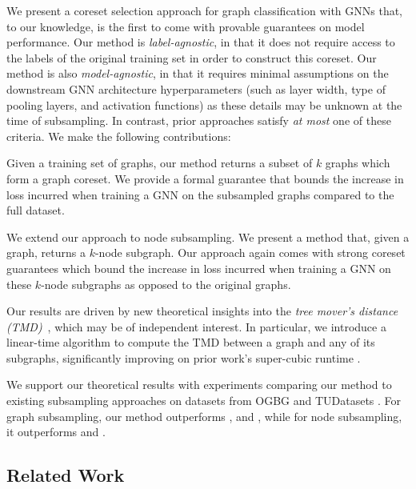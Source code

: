 We present a coreset selection approach for graph classification with GNNs that, to our knowledge, is the first to come with provable guarantees on model performance. Our method is \emph{label-agnostic}, in that it does not require access to the labels of the original training set in order to construct this coreset. Our method is also \emph{model-agnostic}, in that it requires minimal assumptions on the downstream GNN architecture hyperparameters (such as layer width, type of pooling layers, and activation functions) as these details may be unknown at the time of subsampling. In contrast, prior approaches satisfy \emph{at most} one of these criteria. We make the following contributions:

\begin{description}[leftmargin=1.5em, labelindent=1.5em]
\item[Graph subsampling.] Given a training set of graphs, our method returns a subset of $k$ graphs which form a graph coreset. We provide a formal guarantee that bounds the increase in loss incurred when training a GNN on the subsampled graphs compared to the full dataset. 

\item[Node subsampling.] We extend our approach to node subsampling. We present a method that, given a graph, returns a $k$-node subgraph. Our approach again comes with strong coreset guarantees which bound the increase in loss incurred when training a GNN on these $k$-node subgraphs as opposed to the original graphs.

\item[Technical approach.] Our results are driven by new theoretical insights into the \emph{tree mover's distance (TMD)}~\citep{Chuang22:Tree}, which may be of independent interest. In particular, we introduce a linear-time algorithm to compute the TMD between a graph and any of its subgraphs, significantly improving on prior work's super-cubic runtime \citep{Chuang22:Tree}.

\item[Experiments.] We support our theoretical results with experiments comparing our method to existing subsampling approaches on datasets from OGBG and TUDatasets \citep{morris2020tudataset}. For graph subsampling, our method outperforms \citet{jin2022condensing, mirage}, and \citet{kidd}, while for node subsampling, it outperforms \citet{razin2023ability} and \citet{salha2022degeneracy}. 
\end{description}


\subsection{Related Work}\label{sec:related-work}

